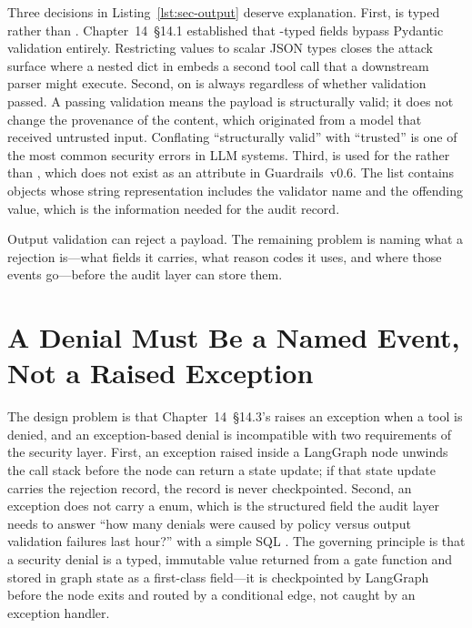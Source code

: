 Three decisions in Listing~\ref{lst:sec-output} deserve explanation.
First,  is typed  rather than . Chapter~14~\S14.1 established
that -typed fields bypass Pydantic validation entirely.
Restricting values to scalar JSON types closes the attack surface where
a nested dict in  embeds a second tool call that a
downstream parser might execute. Second,  on
 is always 
regardless of whether validation passed. A passing validation means the
payload is structurally valid; it does not change the provenance of the
content, which originated from a model that received untrusted input.
Conflating ``structurally valid'' with ``trusted'' is one of the most
common security errors in LLM systems. Third, 
is used for the  rather than ,
which does not exist as an attribute in Guardrails~v0.6. The
 list contains  objects
whose string representation includes the validator name and the
offending value, which is the information needed for the audit record.

Output validation can reject a payload. The remaining problem is naming
what a rejection is---what fields it carries, what reason codes it
uses, and where those events go---before the audit layer can store
them.


\section{A Denial Must Be a Named Event, Not a Raised Exception}
\label{sec:sec-rejection}

The design problem is that Chapter~14~\S14.3's
 raises an exception when a tool is denied,
and an exception-based denial is incompatible with two requirements of
the security layer. First, an exception raised inside a LangGraph node
unwinds the call stack before the node can return a state update; if
that state update carries the rejection record, the record is never
checkpointed. Second, an exception does not carry a
 enum, which is the structured field the audit
layer needs to answer ``how many denials were caused by policy versus
output validation failures last hour?'' with a simple SQL
. The governing principle is that a security denial is
a typed, immutable value returned from a gate function and stored in
graph state as a first-class field---it is checkpointed by LangGraph
before the node exits and routed by a conditional edge, not caught by
an exception handler.


